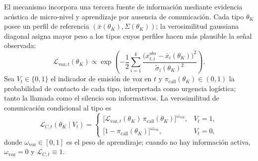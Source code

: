 \documentclass[review,authoryear,12pt]{elsarticle}
\theoremstyle{plain}
\theoremstyle{definition}
\newcommand{\1}{\mathbf{1}}
\begin{document}
El mecanismo incorpora una tercera fuente de información mediante evidencia acústica de micro-nivel y aprendizaje por ausencia de comunicación. Cada tipo $\theta_K$ posee un perfil de referencia $(\bar{x}(\theta_K),\Sigma(\theta_K))$; la verosimilitud gaussiana diagonal asigna mayor peso a los tipos cuyos perfiles hacen más plausible la señal observada:
\begin{equation}
\mathcal{L}_{\mathrm{voz},t}(\theta_K)\propto\exp\!\left(-\frac{1}{2}\sum_{i=1}^{k}\frac{\bigl(x_{t,i}^{obs}-\bar{x}_i(\theta_K)\bigr)^2}{\tilde{\sigma}_i(\theta_K)^2}\right).
\label{eq:Lvoz}
\end{equation}
Sea $V_t\in\{0,1\}$ el indicador de emisión de voz en $t$ y $\pi_{\mathrm{call}}(\theta_K)\in(0,1)$ la probabilidad de contacto de cada tipo, interpretada como urgencia logística; tanto la llamada como el silencio son informativos. La verosimilitud de comunicación condicional al tipo es
\begin{equation}
\mathcal{L}_{C,t}(\theta_K\mid V_t)=\begin{cases}\bigl[\mathcal{L}_{\mathrm{voz},t}(\theta_K)\,\pi_{\mathrm{call}}(\theta_K)\bigr]^{\omega_{\mathrm{voz}}}, & V_t=1,\\[0.5em]\bigl[1-\pi_{\mathrm{call}}(\theta_K)\bigr]^{\omega_{\mathrm{voz}}}, & V_t=0,\end{cases}
\label{eq:LC}
\end{equation}
donde $\omega_{\mathrm{voz}}\in[0,1]$ es el peso de aprendizaje; cuando no hay información activa, $\omega_{\mathrm{voz}}=0$ y $\mathcal{L}_{C,t}\equiv 1$.
\end{document}
